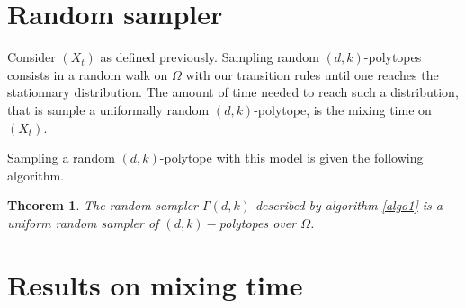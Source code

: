 \documentclass[11pt]{article}
\newtheorem{theorem}{Theorem}
\begin{document}
\section{Random sampler}

Consider $(X_t)$ as defined previously. Sampling random $(d, k)$-polytopes consists in a random walk on $\Omega$ with our transition rules until one reaches the stationnary distribution. The amount of time needed to reach such a distribution, that is sample a uniformally random $(d, k)$-polytope, is the mixing time on $(X_t)$.

Sampling a random $(d, k)$-polytope with this model is given the following algorithm.

\vspace{0.5cm}



\begin{theorem}\label{thm:random-sampler}
  The random sampler $\Gamma(d,k)$ described by algorithm \ref{algo1} is a uniform random sampler of $(d,k)-$polytopes over $\Omega$.
\end{theorem}

\section{Results on mixing time}



\clearpage


\end{document}
